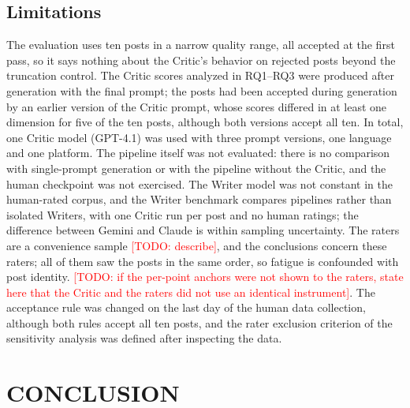 \documentclass[a4paper,twoside]{article}
\newcommand{\TODO}[1]{\textcolor{red}{[TODO: #1]}}
\begin{document}
\subsection{Limitations}
\label{sec:limitations}

The evaluation uses ten posts in a narrow quality range, all accepted at the first pass, so it says nothing about the Critic's behavior on rejected posts beyond the truncation control. The Critic scores analyzed in RQ1--RQ3 were produced after generation with the final prompt; the posts had been accepted during generation by an earlier version of the Critic prompt, whose scores differed in at least one dimension for five of the ten posts, although both versions accept all ten. In total, one Critic model (GPT-4.1) was used with three prompt versions, one language and one platform. The pipeline itself was not evaluated: there is no comparison with single-prompt generation or with the pipeline without the Critic, and the human checkpoint was not exercised. The Writer model was not constant in the human-rated corpus, and the Writer benchmark compares pipelines rather than isolated Writers, with one Critic run per post and no human ratings; the difference between Gemini and Claude is within sampling uncertainty. The raters are a convenience sample \TODO{describe}, and the conclusions concern these raters; all of them saw the posts in the same order, so fatigue is confounded with post identity. \TODO{if the per-point anchors were not shown to the raters, state here that the Critic and the raters did not use an identical instrument}. The acceptance rule was changed on the last day of the human data collection, although both rules accept all ten posts, and the rater exclusion criterion of the sensitivity analysis was defined after inspecting the data.

\section{\uppercase{Conclusion}}
\label{sec:conclusion}
\end{document}
